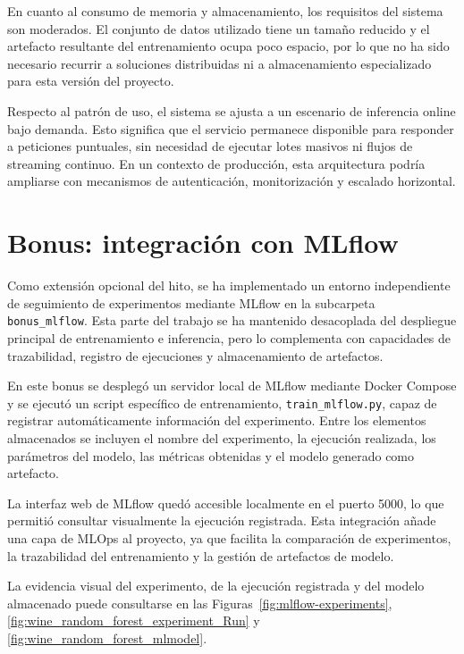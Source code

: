 En cuanto al consumo de memoria y almacenamiento, los requisitos del sistema son moderados. El conjunto de datos utilizado tiene un
tama\~no reducido y el artefacto resultante del entrenamiento ocupa poco espacio, por lo que no ha sido necesario recurrir a soluciones
distribuidas ni a almacenamiento especializado para esta versi\'on del proyecto.

Respecto al patr\'on de uso, el sistema se ajusta a un escenario de inferencia online bajo demanda. Esto significa que el servicio
permanece disponible para responder a peticiones puntuales, sin necesidad de ejecutar lotes masivos ni flujos de streaming continuo.
En un contexto de producci\'on, esta arquitectura podr\'ia ampliarse con mecanismos de autenticaci\'on, monitorizaci\'on y escalado
horizontal.

\section{Bonus: integraci\'on con MLflow}

Como extensi\'on opcional del hito, se ha implementado un entorno independiente de seguimiento de experimentos mediante MLflow en la
subcarpeta \texttt{bonus\_mlflow}. Esta parte del trabajo se ha mantenido desacoplada del despliegue principal de entrenamiento e
inferencia, pero lo complementa con capacidades de trazabilidad, registro de ejecuciones y almacenamiento de artefactos.

En este bonus se despleg\'o un servidor local de MLflow mediante Docker Compose y se ejecut\'o un script espec\'ifico de entrenamiento,
\texttt{train\_mlflow.py}, capaz de registrar autom\'aticamente informaci\'on del experimento. Entre los elementos almacenados se
incluyen el nombre del experimento, la ejecuci\'on realizada, los par\'ametros del modelo, las m\'etricas obtenidas y el modelo generado
como artefacto.

La interfaz web de MLflow qued\'o accesible localmente en el puerto 5000, lo que permiti\'o consultar visualmente la ejecuci\'on registrada.
Esta integraci\'on a\~nade una capa de MLOps al proyecto, ya que facilita la comparaci\'on de experimentos, la trazabilidad del entrenamiento
y la gesti\'on de artefactos de modelo.

La evidencia visual del experimento, de la ejecuci\'on registrada y del modelo almacenado puede consultarse en las
Figuras~\ref{fig:mlflow-experiments}, \ref{fig:wine_random_forest_experiment_Run} y \ref{fig:wine_random_forest_mlmodel}.

